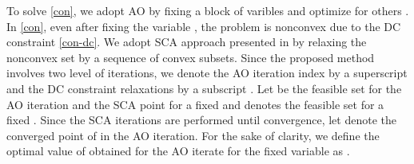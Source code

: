 To solve \eqref{con}, we adopt \ac{AO} by fixing a block of varibles and optimize for others \cite{bezdek2002some}. In \eqref{con}, even after fixing the variable \me{\my}, the problem is nonconvex due to the \ac{DC} constraint \eqref{con-dc}. We adopt \ac{SCA} approach presented in \cite{lipp2014variations,lanckriet2009convergence,scutari_1} by relaxing the nonconvex set by a sequence of convex subsets. Since the proposed method involves two level of iterations, we denote the \ac{AO} iteration index by a superscript  and the \ac{DC} constraint relaxations by a subscript . Let  be the feasible set for the  \ac{AO} iteration and the  \ac{SCA} point for a fixed \me{\my} and  denotes the feasible set for a fixed \me{\mx}. Since the \ac{SCA} iterations are performed until convergence, let  denote the converged point of \me{\mx} in the  \ac{AO} iteration. For the sake of clarity, we define the optimal value of \me{\mz} obtained for the  \ac{AO} iterate for the fixed \me{\my} variable as .

